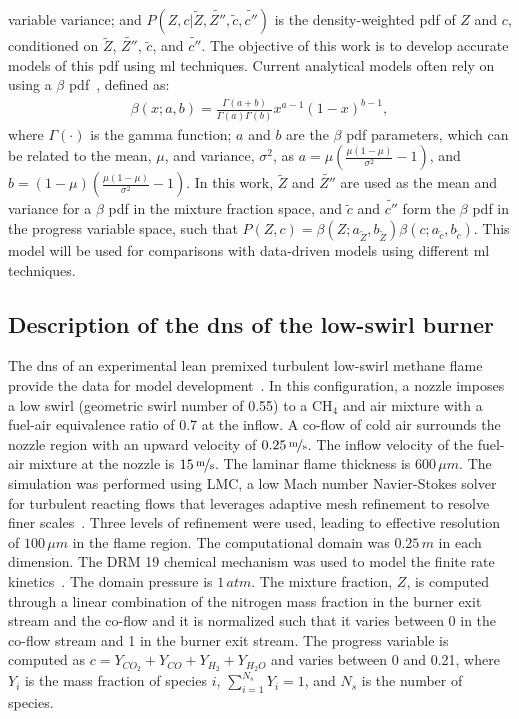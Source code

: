 \documentclass[review]{elsarticle}
\newcommand{\wt}[1]{\widetilde{#1}}
\begin{document}
variable variance; and $P(Z,c | \wt{Z}, \wt{Z''}, \wt{c}, \wt{c''})$
is the density-weighted \gls{pdf} of $Z$ and $c$, conditioned on
$\wt{Z}$, $\wt{Z''}$, $\wt{c}$, and $\wt{c''}$. The objective of this
work is to develop accurate models of this \gls{pdf} using \gls{ml}
techniques. Current analytical models often rely on using a $\beta$
\gls{pdf}~\cite{Cook1994}, defined as:
\begin{align}
  \label{eq:beta}
  \beta(x; a, b) = \frac{\Gamma(a + b)}{\Gamma(a)\Gamma(b)} x^{a-1} (1-x)^{b-1},
\end{align}
where $\Gamma(\cdot)$ is the gamma function; $a$ and $b$ are the
$\beta$ \gls{pdf} parameters, which can be related to the mean, $\mu$, and
variance, $\sigma^2$, as
$a=\mu \left( \frac{\mu (1-\mu)}{\sigma^2} - 1\right)$, and
$b=(1-\mu) \left( \frac{\mu (1-\mu)}{\sigma^2} - 1\right)$. In this
work, $\wt{Z}$ and $\wt{Z''}$ are used as the mean and variance for a
$\beta$ \gls{pdf} in the mixture fraction space, and $\wt{c}$ and $\wt{c''}$
form the $\beta$ \gls{pdf} in the progress variable space, such that
$P(Z,c) = \beta(Z; a_{\wt{Z}}, b_{\wt{Z}}) \beta(c; a_{\wt{c}},
b_{\wt{c}})$. This model will be used for comparisons with data-driven
models using different \gls{ml} techniques.

\subsection{Description of the \acrlong{dns} of the low-swirl burner}\label{sec:dns}
The \gls{dns} of an experimental lean premixed turbulent low-swirl
methane flame provide the data for model
development~\cite{Day2012,Cheng2000}. In this configuration, a nozzle
imposes a low swirl (geometric swirl number of 0.55) to a CH$_4$ and
air mixture with a fuel-air equivalence ratio of 0.7 at the inflow. A
co-flow of cold air surrounds the nozzle region with an upward
velocity of $0.25\,\unitfrac{m}{s}$. The inflow velocity of the
fuel-air mixture at the nozzle is $15\,\unitfrac{m}{s}$. The laminar
flame thickness is $600\,\unit{\mu m}$. The simulation was performed
using LMC, a low Mach number Navier-Stokes solver for turbulent
reacting flows that leverages adaptive mesh refinement to resolve
finer scales~\cite{Day2000}. Three levels of refinement were used,
leading to effective resolution of $100\,\unit{\mu m}$ in the flame
region. The computational domain was $0.25\,\unit{m}$ in each
dimension. The DRM 19 chemical mechanism was used to model the finite
rate kinetics~\cite{Kazakov1994}. The domain pressure is
$1\,\unit{atm}$. The mixture fraction, $Z$, is computed through a linear
combination of the nitrogen mass fraction in the burner exit stream
and the co-flow and it is normalized such that it varies between 0 in the
co-flow stream and 1 in the burner exit stream. The progress variable
is computed as $c= Y_{CO_2} + Y_{CO} + Y_{H_2} + Y_{H_2O}$ and varies
between 0 and 0.21, where $Y_i$ is the mass fraction of species $i$, 
$\sum^{N_s}_{i=1} Y_i = 1$, and $N_s$ is the number of species.
\end{document}
